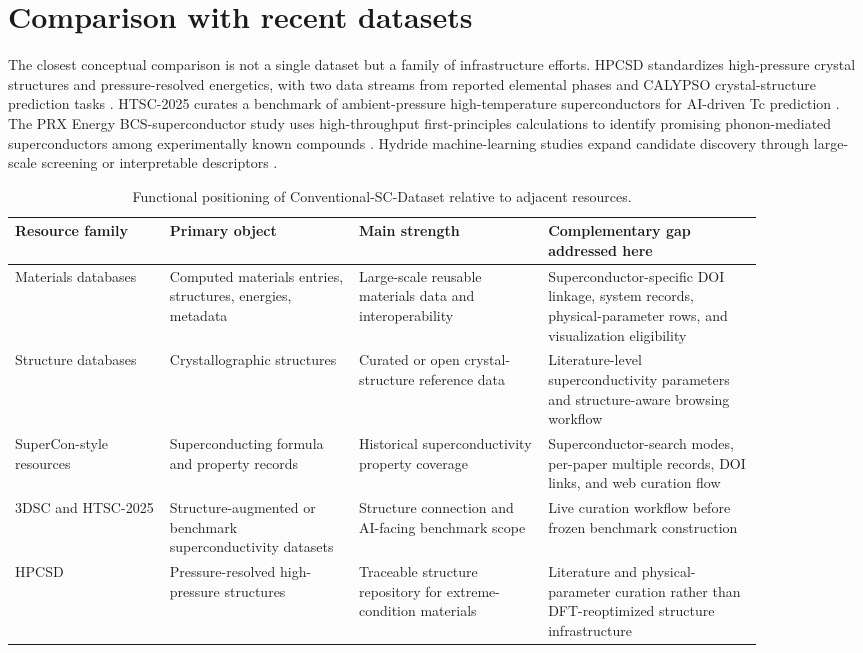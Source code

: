 \documentclass[11pt,a4paper]{article}
\begin{document}
\section{Comparison with recent datasets}

The closest conceptual comparison is not a single dataset but a family of infrastructure efforts. HPCSD standardizes high-pressure crystal structures and pressure-resolved energetics, with two data streams from reported elemental phases and CALYPSO crystal-structure prediction tasks \cite{wang2026hpcsd}. HTSC-2025 curates a benchmark of ambient-pressure high-temperature superconductors for AI-driven Tc prediction \cite{han2025htsc}. The PRX Energy BCS-superconductor study uses high-throughput first-principles calculations to identify promising phonon-mediated superconductors among experimentally known compounds \cite{bercx2025prxenergy}. Hydride machine-learning studies expand candidate discovery through large-scale screening or interpretable descriptors \cite{pires2026ambient,chen2026descriptors}.

\begin{table}[t]
\centering
\caption{Functional positioning of Conventional-SC-Dataset relative to adjacent resources.}
\label{tab:comparison}
\begin{tabular}{>{\raggedright\arraybackslash}p{0.18\linewidth} >{\raggedright\arraybackslash}p{0.22\linewidth} >{\raggedright\arraybackslash}p{0.22\linewidth} >{\raggedright\arraybackslash}p{0.25\linewidth}}
\toprule
Resource family & Primary object & Main strength & Complementary gap addressed here \\
\midrule
Materials databases & Computed materials entries, structures, energies, metadata & Large-scale reusable materials data and interoperability & Superconductor-specific DOI linkage, system records, physical-parameter rows, and visualization eligibility \\
Structure databases & Crystallographic structures & Curated or open crystal-structure reference data & Literature-level superconductivity parameters and structure-aware browsing workflow \\
SuperCon-style resources & Superconducting formula and property records & Historical superconductivity property coverage & Superconductor-search modes, per-paper multiple records, DOI links, and web curation flow \\
3DSC and HTSC-2025 & Structure-augmented or benchmark superconductivity datasets & Structure connection and AI-facing benchmark scope & Live curation workflow before frozen benchmark construction \\
HPCSD & Pressure-resolved high-pressure structures & Traceable structure repository for extreme-condition materials & Literature and physical-parameter curation rather than DFT-reoptimized structure infrastructure \\
\bottomrule
\end{tabular}
\end{table}
\end{document}
